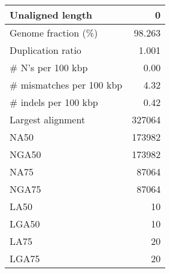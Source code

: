 \documentclass[12pt,a4paper]{article}
\begin{document}
\begin{table}[ht]
\begin{center}
\begin{tabular}{|l*{1}{|r}|}
Unaligned length & 0 \\ \hline
Genome fraction (\%) & 98.263 \\ \hline
Duplication ratio & 1.001 \\ \hline
\# N's per 100 kbp & 0.00 \\ \hline
\# mismatches per 100 kbp & 4.32 \\ \hline
\# indels per 100 kbp & 0.42 \\ \hline
Largest alignment & 327064 \\ \hline
NA50 & 173982 \\ \hline
NGA50 & 173982 \\ \hline
NA75 & 87064 \\ \hline
NGA75 & 87064 \\ \hline
LA50 & 10 \\ \hline
LGA50 & 10 \\ \hline
LA75 & 20 \\ \hline
LGA75 & 20 \\ \hline
\end{tabular}
\end{center}
\end{table}
\end{document}
